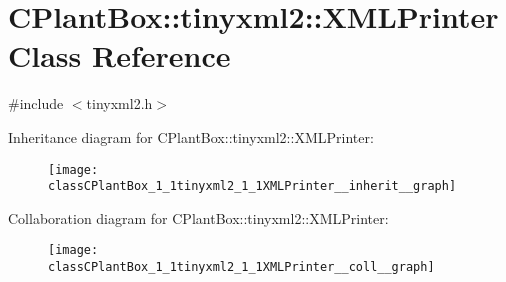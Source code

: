 \hypertarget{classCPlantBox_1_1tinyxml2_1_1XMLPrinter}{}\section{C\+Plant\+Box\+:\+:tinyxml2\+:\+:X\+M\+L\+Printer Class Reference}
\label{classCPlantBox_1_1tinyxml2_1_1XMLPrinter}


{\ttfamily \#include $<$tinyxml2.\+h$>$}



Inheritance diagram for C\+Plant\+Box\+:\+:tinyxml2\+:\+:X\+M\+L\+Printer\+:\nopagebreak
\begin{figure}[H]
\begin{center}
\leavevmode
\texttt{[image: classCPlantBox\_1\_1tinyxml2\_1\_1XMLPrinter\_\_inherit\_\_graph]}
\end{center}
\end{figure}


Collaboration diagram for C\+Plant\+Box\+:\+:tinyxml2\+:\+:X\+M\+L\+Printer\+:\nopagebreak
\begin{figure}[H]
\begin{center}
\leavevmode
\texttt{[image: classCPlantBox\_1\_1tinyxml2\_1\_1XMLPrinter\_\_coll\_\_graph]}
\end{center}
\end{figure}
